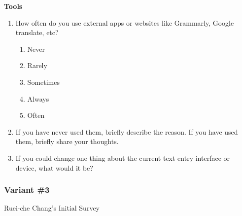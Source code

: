 \documentclass[acmsmall,screen,authorversion,nonacm]{acmart}
\begin{document}
\textbf{Tools}
\begin{enumerate}
    \item How often do you use external apps or websites like Grammarly, Google translate, etc?
        \begin{enumerate}
            \item Never 
            \item Rarely
            \item Sometimes
            \item Always 
            \item Often
        \end{enumerate}
    \item If you have never used them, briefly describe the reason. If you have used them, briefly share your thoughts.
    \item If you could change one thing about the current text entry interface or device, what would it be?
\end{enumerate}

\subsubsection{Variant \#3}
\label{var3}

Ruei-che Chang’s Initial Survey
\end{document}
